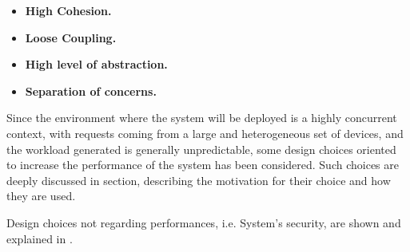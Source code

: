 \begin{itemize}
	\item \textbf{High Cohesion.}
	\item \textbf{Loose Coupling.}
	\item \textbf{High level of abstraction.}
	\item \textbf{Separation of concerns.}
\end{itemize}

Since the environment where the system will be deployed is a highly concurrent context, with requests coming from a large and heterogeneous set of devices, and the workload generated is generally unpredictable, some design choices oriented to increase the performance of the system has been considered.
Such choices are deeply discussed in \textit{} section, describing the motivation for their choice and how they are used.

Design choices not regarding performances, i.e. System's security, are shown and explained in \textit{}.
